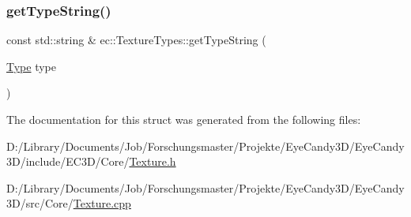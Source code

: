 \subsubsection{\texorpdfstring{get\+Type\+String()}{getTypeString()}}
{\footnotesize\ttfamily const std\+::string \& ec\+::\+Texture\+Types\+::get\+Type\+String (\begin{DoxyParamCaption}\item[{\mbox{\hyperlink{structec_1_1_texture_types_aff67825b98dd1edd7e4783350e866202}{Type}}}]{type }\end{DoxyParamCaption})\hspace{0.3cm}{\ttfamily [static]}}



The documentation for this struct was generated from the following files\+:\begin{DoxyCompactItemize}
\item 
D\+:/\+Library/\+Documents/\+Job/\+Forschungsmaster/\+Projekte/\+Eye\+Candy3\+D/\+Eye\+Candy3\+D/include/\+E\+C3\+D/\+Core/\mbox{\hyperlink{_texture_8h}{Texture.\+h}}\item 
D\+:/\+Library/\+Documents/\+Job/\+Forschungsmaster/\+Projekte/\+Eye\+Candy3\+D/\+Eye\+Candy3\+D/src/\+Core/\mbox{\hyperlink{_texture_8cpp}{Texture.\+cpp}}\end{DoxyCompactItemize}
